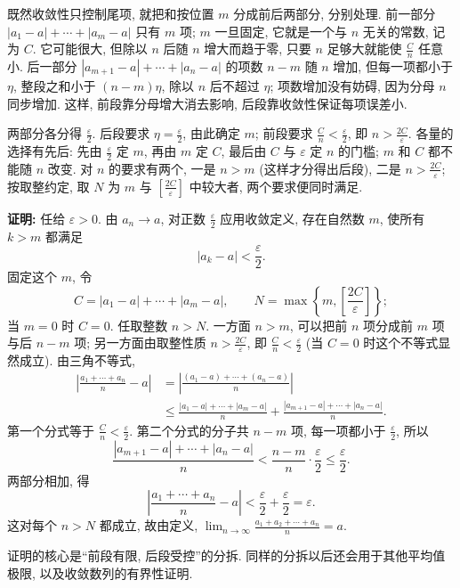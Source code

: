 \documentclass[UTF8,openany]{ctexbook}
\theoremstyle{chinesetextbook}
\newenvironment{cnproof}{\par\indent\textbf{证明:} \ignorespaces}{\par}
\begin{document}
既然收敛性只控制尾项, 就把和按位置 $m$ 分成前后两部分, 分别处理.
前一部分 $|a_1-a|+\cdots+|a_m-a|$ 只有 $m$ 项; $m$ 一旦固定, 它就是一个与 $n$ 无关的常数, 记为 $C$. 它可能很大, 但除以 $n$ 后随 $n$ 增大而趋于零, 只要 $n$ 足够大就能使 $\displaystyle\frac Cn$ 任意小. 后一部分 $|a_{m+1}-a|+\cdots+|a_n-a|$ 的项数 $n-m$ 随 $n$ 增加, 但每一项都小于 $\eta$, 整段之和小于 $(n-m)\eta$, 除以 $n$ 后不超过 $\eta$; 项数增加没有妨碍, 因为分母 $n$ 同步增加. 这样, 前段靠分母增大消去影响, 后段靠收敛性保证每项误差小.

两部分各分得 $\displaystyle\frac\varepsilon2$. 后段要求 $\displaystyle\eta=\frac\varepsilon2$, 由此确定 $m$; 前段要求 $\displaystyle\frac Cn<\frac\varepsilon2$, 即 $\displaystyle n>\frac{2C}\varepsilon$. 各量的选择有先后: 先由 $\displaystyle\frac\varepsilon2$ 定 $m$, 再由 $m$ 定 $C$, 最后由 $C$ 与 $\varepsilon$ 定 $n$ 的门槛; $m$ 和 $C$ 都不能随 $n$ 改变. 对 $n$ 的要求有两个, 一是 $n>m$ (这样才分得出后段), 二是 $\displaystyle n>\frac{2C}\varepsilon$; 按取整约定, 取 $N$ 为 $m$ 与 $\displaystyle\left[\frac{2C}\varepsilon\right]$ 中较大者, 两个要求便同时满足.

\begin{cnproof}
任给 $\varepsilon>0$. 由 $a_n\to a$, 对正数 $\displaystyle\frac\varepsilon2$ 应用收敛定义, 存在自然数 $m$, 使所有 $k>m$ 都满足
\[
|a_k-a|<\frac\varepsilon2.
\]
固定这个 $m$, 令
\[
C=|a_1-a|+\cdots+|a_m-a|,\qquad
N=\max\left\{m,\left[\frac{2C}\varepsilon\right]\right\};
\]
当 $m=0$ 时 $C=0$. 任取整数 $n>N$. 一方面 $n>m$, 可以把前 $n$ 项分成前 $m$ 项与后 $n-m$ 项; 另一方面由取整性质 $\displaystyle n>\frac{2C}\varepsilon$, 即 $\displaystyle\frac Cn<\frac\varepsilon2$ (当 $C=0$ 时这个不等式显然成立). 由三角不等式,
\[
\begin{aligned}
\left|\frac{a_1+\cdots+a_n}{n}-a\right|
&=\left|\frac{(a_1-a)+\cdots+(a_n-a)}n\right|\\
&\le\frac{|a_1-a|+\cdots+|a_m-a|}{n}
 +\frac{|a_{m+1}-a|+\cdots+|a_n-a|}{n}.
\end{aligned}
\]
第一个分式等于 $\displaystyle\frac Cn<\frac\varepsilon2$. 第二个分式的分子共 $n-m$ 项, 每一项都小于 $\displaystyle\frac\varepsilon2$, 所以
\[
\frac{|a_{m+1}-a|+\cdots+|a_n-a|}{n}
<\frac{n-m}{n}\cdot\frac\varepsilon2
\le\frac\varepsilon2.
\]
两部分相加, 得
\[
\left|\frac{a_1+\cdots+a_n}{n}-a\right|
<\frac\varepsilon2+\frac\varepsilon2=\varepsilon.
\]
这对每个 $n>N$ 都成立, 故由定义, $\displaystyle\lim_{n\to\infty}\frac{a_1+a_2+\cdots+a_n}{n}=a$.
\end{cnproof}

证明的核心是“前段有限, 后段受控”的分拆. 同样的分拆以后还会用于其他平均值极限, 以及收敛数列的有界性证明.
\end{document}
